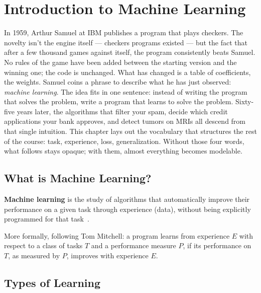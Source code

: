 \chapter{Introduction to Machine Learning}
\label{ch:introduction}

In 1959, Arthur Samuel at IBM publishes a program that plays checkers. The novelty isn't the engine itself --- checkers programs existed --- but the fact that after a few thousand games against itself, the program consistently beats Samuel. No rules of the game have been added between the starting version and the winning one; the code is unchanged. What has changed is a table of coefficients, the weights. Samuel coins a phrase to describe what he has just observed: \emph{machine learning}. The idea fits in one sentence: instead of writing the program that solves the problem, write a program that learns to solve the problem. Sixty-five years later, the algorithms that filter your spam, decide which credit applications your bank approves, and detect tumors on MRIs all descend from that single intuition. This chapter lays out the vocabulary that structures the rest of the course: task, experience, loss, generalization. Without those four words, what follows stays opaque; with them, almost everything becomes modelable.

\section{What is Machine Learning?}

\begin{definition}
\textbf{Machine learning} is the study of algorithms that automatically
improve their performance on a given task through experience (data), without
being explicitly programmed for that task~\cite{murphy2022}.
\end{definition}

More formally, following Tom Mitchell: a program learns from experience $E$
with respect to a class of tasks $T$ and a performance measure $P$, if its
performance on $T$, as measured by $P$, improves with experience $E$.

\section{Types of Learning}
\label{sec:types}

